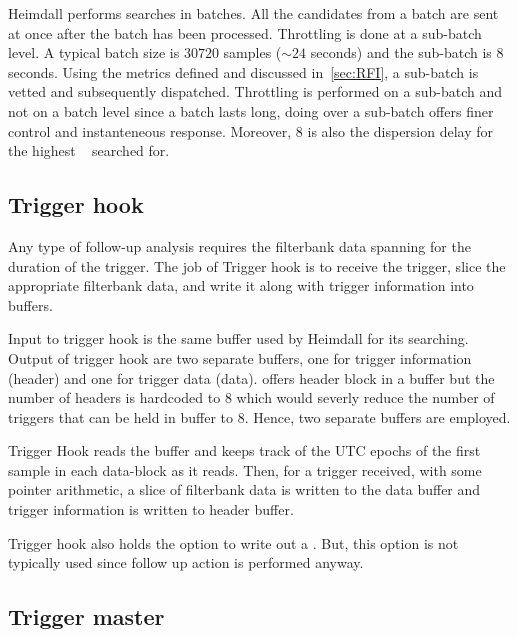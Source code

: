 \par Heimdall performs searches in batches. All the candidates from a batch are sent at once after the batch has been processed.
Throttling is done at a sub-batch level. A typical batch size is $30720$ samples ($\sim 24$ seconds) and the sub-batch is $8$ seconds.
Using the metrics defined and discussed in~\autoref{sec:RFI}, a sub-batch is vetted and subsequently dispatched.
Throttling is performed on a sub-batch and not on a batch level since a batch lasts long, doing over a sub-batch offers finer control and instanteneous response.
Moreover, $8$ is also the dispersion delay for the highest \dm~ searched for.

\subsection {Trigger hook}

\par Any type of follow-up analysis requires the filterbank data spanning for the duration of the trigger. The job of Trigger hook is to receive the \dbson trigger, slice the appropriate filterbank data, and write it along with trigger information into \dada buffers.

\par Input to trigger hook is the same \dada buffer used by Heimdall for its searching. Output of trigger hook are two separate \dada buffers, one for trigger information (header) and one for trigger data (data). 
\dada offers header block in a buffer but the number of headers is hardcoded to $8$ which would severly reduce the number of triggers that can be held in buffer to $8$.  Hence, two separate buffers are employed.

\par Trigger Hook reads the buffer and keeps track of the UTC epochs of the first sample in each data-block as it reads. 
Then, for a trigger received, with some pointer arithmetic, a slice of filterbank data is written to the data \dada buffer and trigger information is written to header \dada buffer.

\par Trigger hook also holds the option to write out a \fbson. But, this option is not typically used since follow up action is performed anyway.

\subsection {Trigger master}

